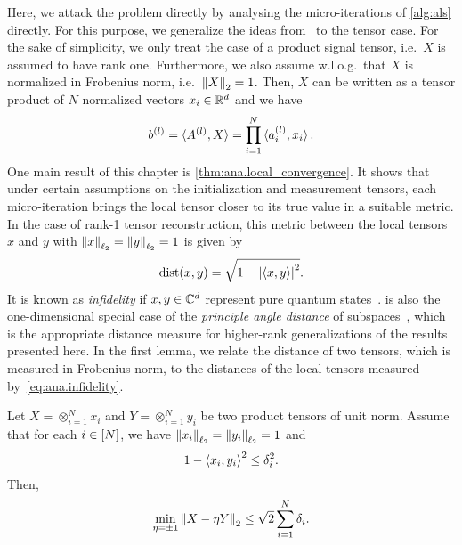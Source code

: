 Here, we attack the problem directly by analysing the micro-iterations of \cref{alg:als} directly.
For this purpose, we generalize the ideas from~\cite{Zhong} to the tensor case.
For the sake of simplicity, we only treat the case of a product signal tensor, i.e.\ $X$ is assumed to have rank one.
Furthermore, we also assume w.l.o.g.\ that $X$ is normalized in Frobenius norm, i.e.\ ${\Vert X\Vert}_2 = 1$.
Then, $X$ can be written as a tensor product of $N$ normalized vectors $x_i \in {\mathbb{R}}^d$ and we have
\[
  b^{(l)} = \braket{A^{(l)}, X} = \prod_{i=1}^N \braket{a^{(l)}_i, x_i}.
  \label{eq:ana.b_as_product}
\]
One main result of this chapter is \cref{thm:ana.local_convergence}.
It shows that under certain assumptions on the initialization and measurement tensors, each micro-iteration brings the local tensor closer to its true value in a suitable metric.
In the case of rank-1 tensor reconstruction, this metric between the local tensors $x$ and $y$ with ${\Vert x\Vert}_{\ell_2} = {\Vert y\Vert}_{\ell_2} = 1$ is given by
\[
  \mathrm{dist}(x, y) = \sqrt{1 - {\left\vert\braket{x, y}\right\vert}^2}.
  \label{eq:ana.infidelity}
\]
It is known as \emph{infidelity} if $x, y \in {\mathbb{C}}^d$ represent pure quantum states~\cite{Nielsen_2010_Quantum}.
 is also the one-dimensional special case of the \emph{principle angle distance} of subspaces~\cite{Golub}, which is the appropriate distance measure for higher-rank generalizations of the results presented here.
In the first lemma, we relate the  distance of two tensors, which is measured in Frobenius norm, to the distances of the local tensors measured by~\eqref{eq:ana.infidelity}.
\begin{lemma}%
  \label{lem:ana.local_global_closeness}
  Let $X = \otimes_{i=1}^N x_i$ and $Y = \otimes_{i=1}^N y_i$ be two product tensors of unit norm.
  Assume that for each $i \in [N]$, we have ${\Vert x_i\Vert}_{\ell_2} = {\Vert y_i\Vert}_{\ell_2} = 1$ and
  \[
    \label{eq:ana.local_global_closeness.local_close}
    1 - \Braket{x_i, y_i}^2 \le \delta_i^2.
  \]
  Then,
  \[
    \min_{\eta = \pm 1} {\left\Vert X - \eta Y\right\Vert}_{2} \le \sqrt{2} \sum_{i=1}^N \delta_i.
  \]
\end{lemma}
